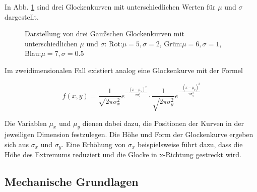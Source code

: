 \documentclass[a4paper,fontsize=12pt,toc=bib,halfparskip]{scrartcl}
\begin{document}
In Abb. \ref{Gauss} sind drei Glockenkurven mit unterschiedlichen Werten f\"ur $\mu$ und $\sigma$ dargestellt.


\begin{figure}
	\centering
	\caption{Darstellung von drei Gau{\ss}schen Glockenkurven mit unterschiedlichen $\mu$ und $\sigma$: Rot:$\mu=5, \sigma=2$, Gr\"un:$\mu=6, \sigma=1$, Blau:$\mu=7, \sigma=0.5$}
	\label{Gauss}
\end{figure}

Im zweidimensionalen Fall existiert analog eine Glockenkurve mit der Formel

\begin{equation}
	f(x,y) = 
	\frac{1}{\sqrt{2\pi \sigma_x^2}}e^{-\frac{(x-\mu_x)^2}{2\sigma_x^2}} \cdot 
	\frac{1}{\sqrt{2\pi \sigma_y^2}}e^{-\frac{(x-\mu_y)^2}{2\sigma_y^2}}
\end{equation}

Die Variablen $\mu_x$ und $\mu_y$ dienen dabei dazu, die Positionen der Kurven in der jeweiligen Dimension festzulegen. Die H\"ohe und Form der Glockenkurve ergeben sich aus $\sigma_x$ und $\sigma_y$. Eine Erh\"ohung von $\sigma_x$ beispielsweise f\"uhrt dazu, dass die H\"ohe des Extremums reduziert und die Glocke in x-Richtung gestreckt wird.

\subsection{Mechanische Grundlagen}
\end{document}
